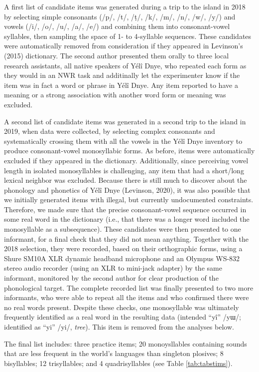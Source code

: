 \documentclass[english,,man,floatsintext]{apa6}
\begin{document}
A first list of candidate items was generated during a trip to the island in 2018 by selecting simple consonants (/p/, /t/, /ṭ/, /k/, /m/, /n/, /w/, /y/) and vowels (/i/, /o/, /u/, /a/, /e/) and combining them into consonant-vowel syllables, then sampling the space of 1- to 4-syllable sequences. These candidates were automatically removed from consideration if they appeared in Levinson's (2015) dictionary. The second author presented them orally to three local research assistants, all native speakers of Yélî Dnye, who repeated each form as they would in an NWR task and additinally let the experimenter know if the item was in fact a word or phrase in Yélî Dnye. Any item reported to have a meaning or a strong association with another word form or meaning was excluded.

A second list of candidate items was generated in a second trip to the island in 2019, when data were collected, by selecting complex consonants and systematically crossing them with all the vowels in the Yélî Dnye inventory to produce consonant-vowel monosyllabic forms. As before, items were automatically excluded if they appeared in the dictionary. Additionally, since perceiving vowel length in isolated monosyllables is challenging, any item that had a short/long lexical neighbor was excluded. Because there is still much to discover about the phonology and phonetics of Yélî Dnye (Levinson, 2020), it was also possible that we initially generated items with illegal, but currently undocumented constraints. Therefore, we made sure that the precise consonant-vowel sequence occurred in some real word in the dictionary (i.e., that there was a longer word included the monosyllable as a subsequence). These candidates were then presented to one informant, for a final check that they did not mean anything. Together with the 2018 selection, they were recorded, based on their orthographic forms, using a Shure SM10A XLR dynamic headband microphone and an Olympus WS-832 stereo audio recorder (using an XLR to mini-jack adapter) by the same informant, monitored by the second author for clear production of the phonological target. The complete recorded list was finally presented to two more informants, who were able to repeat all the items and who confirmed there were no real words present. Despite these checks, one monosyllable was ultimately frequently identified as a real word in the resulting data (intended \enquote{yî} /yɯ/; identified as \enquote{yi} /yi/, \emph{tree}). This item is removed from the analyses below.

The final list includes: three practice items; 20 monoysllables containing sounds that are less frequent in the world's languages than singleton plosives; 8 bisyllables; 12 trisyllables; and 4 quadrisyllables (see Table \ref{tab:tabstims}).
\end{document}
